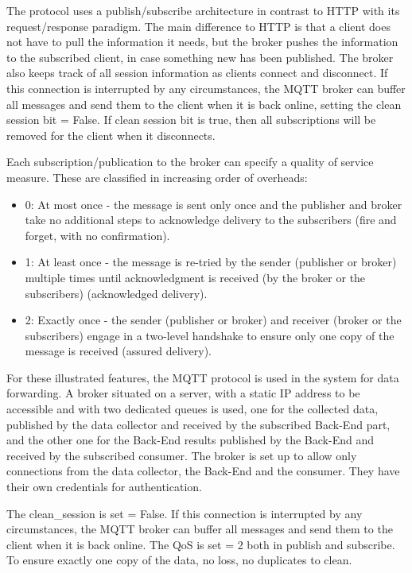 The protocol uses a publish/subscribe architecture in contrast to HTTP with its request/response paradigm. The main difference to HTTP is that a client does not have to pull the information it needs, but the broker pushes the information to the subscribed client, in case something new has been published. The broker also keeps track of all session information as clients connect and disconnect. If this connection is interrupted by any circumstances, the MQTT broker can buffer all messages and send them to the client when it is back online, setting the clean session bit = False. If clean session bit is true, then all subscriptions will be removed for the client when it disconnects.

Each subscription/publication to the broker can specify a quality of service measure. These are classified in increasing order of overheads:
\begin{itemize}
  \item 0: At most once - the message is sent only once and the publisher and broker take no additional steps to acknowledge delivery to the subscribers (fire and forget, with no confirmation).
  \item 1: At least once - the message is re-tried by the sender (publisher or broker) multiple times until acknowledgment is received (by the broker or the subscribers) (acknowledged delivery).
  \item 2: Exactly once - the sender (publisher or broker) and receiver (broker or the subscribers) engage in a two-level handshake to ensure only one copy of the message is received (assured delivery).
\end{itemize}

For these illustrated features, the MQTT protocol is used in the system for data forwarding. A broker situated on a server, with a static IP address to be accessible and with two dedicated queues is used, one for the collected data, published by the data collector and received by the subscribed Back-End part, and the other one for the Back-End results published by the Back-End and received by the subscribed consumer.
The broker is set up to allow only connections from the data collector, the Back-End and the consumer. They have their own credentials for authentication.

The clean\_session is set = False. If this connection is interrupted by any circumstances, the MQTT broker can buffer all messages and send them to the client when it is back online.
The QoS is set = 2 both in publish and subscribe. To ensure exactly one copy of the data, no loss, no duplicates to clean.


